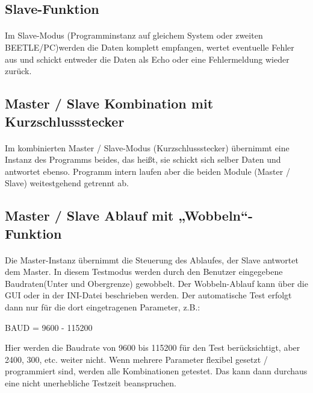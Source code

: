 \subsection{Slave-Funktion}
\paragraph{}
Im Slave-Modus (Programminstanz auf gleichem System oder zweiten BEETLE/PC)werden die Daten komplett empfangen, wertet eventuelle Fehler aus und schickt entweder die Daten als Echo oder eine Fehlermeldung wieder zurück. 

\subsection{Master / Slave Kombination mit Kurzschlussstecker}
\paragraph{}
Im kombinierten Master / Slave-Modus (Kurzschlussstecker) übernimmt eine Instanz des Programms beides, das heißt, sie schickt sich selber Daten und antwortet ebenso. Programm intern laufen aber die beiden Module (Master / Slave) weitestgehend getrennt ab.

\subsection{Master / Slave Ablauf mit „Wobbeln“-Funktion}
\paragraph{}
Die Master-Instanz übernimmt die Steuerung des Ablaufes, der Slave antwortet dem Master. In diesem Testmodus werden durch den Benutzer eingegebene Baudraten(Unter und Obergrenze) gewobbelt. Der Wobbeln-Ablauf kann über die GUI oder in der INI-Datei beschrieben werden. Der automatische Test erfolgt dann nur für die dort eingetragenen Parameter, z.B.:

\begin{center}
BAUD = 9600 - 115200
\end{center}


Hier werden die Baudrate von 9600 bis 115200 für den Test berücksichtigt, aber 2400, 300, etc. weiter nicht. Wenn mehrere Parameter flexibel gesetzt / programmiert sind, werden alle Kombinationen getestet. Das kann dann durchaus eine nicht unerhebliche Testzeit beanspruchen.\\

